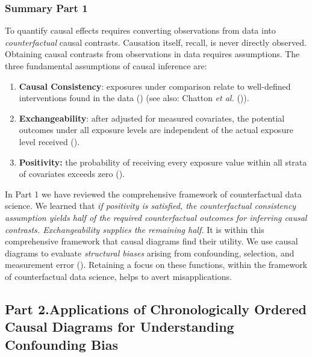 \documentclass[
  singlecolumn]{article}
\begin{document}
\subsubsection{Summary Part 1}\label{summary-part-1}

To quantify causal effects requires converting observations from data
into \emph{counterfactual} causal contrasts. Causation itself, recall,
is never directly observed. Obtaining causal contrasts from observations
in data requires assumptions. The three fundamental assumptions of
causal inference are:

\begin{enumerate}
\def\labelenumi{\arabic{enumi}.}
\item
  \textbf{Causal Consistency}: exposures under comparison relate to
  well-defined interventions found in the data
  () (see also:
  Chatton \emph{et al.} ()).
\item
  \textbf{Exchangeability}: after adjusted for measured covariates, the
  potential outcomes under all exposure levels are independent of the
  actual exposure level received ().
\item
  \textbf{Positivity:} the probability of receiving every exposure value
  within all strata of covariates exceeds zero
  ().
\end{enumerate}

In Part 1 we have reviewed the comprehensive framework of counterfactual
data science. We learned that \emph{if positivity is satisfied, the
counterfactual consistency assumption yields half of the required
counterfactual outcomes for inferring causal contrasts. Exchangeability
supplies the remaining half.} It is within this comprehensive framework
that causal diagrams find their utility. We use causal diagrams to
evaluate \emph{structural biases} arising from confounding, selection,
and measurement error (). Retaining a focus on these functions, within the framework of
counterfactual data science, helps to avert misapplications.

\subsection{Part 2.Applications of Chronologically Ordered Causal
Diagrams for Understanding Confounding
Bias}\label{part-2.applications-of-chronologically-ordered-causal-diagrams-for-understanding-confounding-bias}
\end{document}
